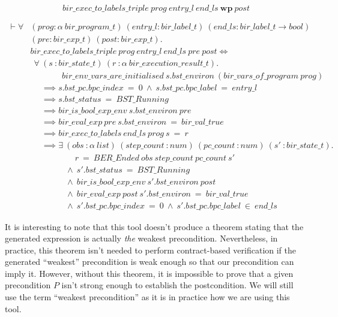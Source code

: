 \documentclass{kththesis}
\begin{document}
{\begin{equation}
    bir\_exec\_to\_labels\_triple~prog~entry\_l~end\_ls~\mathbf{wp}~post
    \label{triple_wp_thm}
\end{equation}

\begin{small}
\begin{equation}
\begin{split}
    \vdash \forall &(prog :\alpha~bir\_program\_t)~(entry\_l :bir\_label\_t)%
    ~(end\_ls :bir\_label\_t \rightarrow bool)\\
    & (pre :bir\_exp\_t)~(post :bir\_exp\_t).\\
    & bir\_exec\_to\_labels\_triple~prog~entry\_l~end\_ls~pre~post \Leftrightarrow\\
    & ~~\forall~(s~:bir\_state\_t)~(r~:\alpha~bir\_execution\_result\_t).\\
    & ~~~~~~~~~~~~~~~~~bir\_env\_vars\_are\_initialised~s.bst\_environ~(bir\_vars\_of\_program~prog)\\
    & ~~~~~~\implies s.bst\_pc.bpc\_index~=~0~\land~s.bst\_pc.bpc\_label~=~entry\_l\\
    & ~~~~~~\implies s.bst\_status~=~BST\_Running\\
    & ~~~~~~\implies bir\_is\_bool\_exp\_env~s.bst\_environ~pre\\
    & ~~~~~~\implies bir\_eval\_exp~pre~s.bst\_environ~=~bir\_val\_true\\
    & ~~~~~~\implies bir\_exec\_to\_labels~end\_ls~prog~s~=~r\\
    & ~~~~~~\implies \exists~(obs~:\alpha~list)~(step\_count~:num)%
    ~(pc\_count~:num)~(s'~:bir\_state\_t).\\
    & ~~~~~~~~~~~~~~~~~~~~~~~~r~=~BER\_Ended~obs~step\_count~pc\_count~s'\\
    & ~~~~~~~~~~~~~~~~~~~\land~s'.bst\_status~=~BST\_Running\\
    & ~~~~~~~~~~~~~~~~~~~\land~bir\_is\_bool\_exp\_env~s'.bst\_environ~post\\
    & ~~~~~~~~~~~~~~~~~~~\land~bir\_eval\_exp~post~s'.bst\_environ~=~bir\_val\_true\\
    & ~~~~~~~~~~~~~~~~~~~\land~s'.bst\_pc.bpc\_index~=~0~\land~s'.bst\_pc.bpc\_label~\in~end\_ls
\end{split}
\label{holba_wp_ht_thm}
\end{equation}
\end{small}

It is interesting to note that this tool doesn't produce a theorem stating that the generated expression is actually \textit{the} weakest precondition. Nevertheless, in practice, this theorem isn't needed to perform contract-based verification if the generated ``weakest'' precondition is weak enough so that our precondition can imply it. However, without this theorem, it is impossible to prove that a given precondition $P$ isn't strong enough to establish the postcondition. We will still use the term ``weakest precondition'' as it is in practice how we are using this tool.

}
\end{document}
